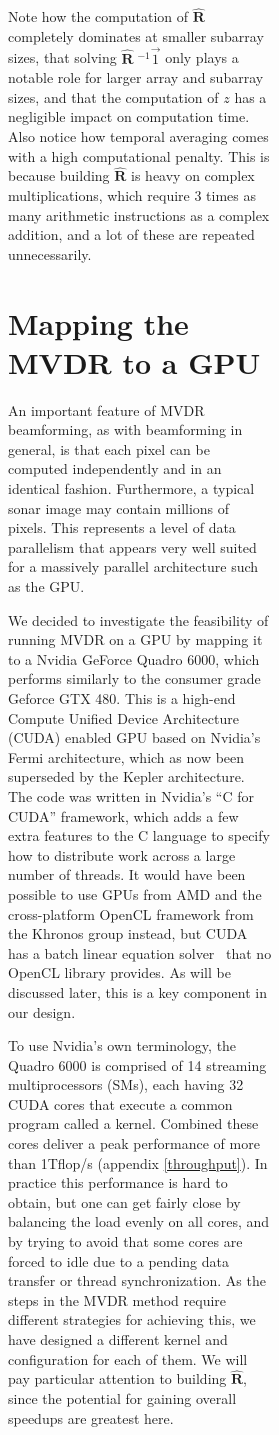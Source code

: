 \documentclass[12pt,journal,draftclsnofoot,onecolumn]{IEEEtran}
\newcommand\mat[1]{\boldsymbol{#1}}
\newcommand\1{\vec 1}
\newcommand*\eR{\mat{\hat R}}
\newcommand*\eRi{\hat{\mat R}\;\!^{-1}}
\begin{document}
\begin{figure}[H]
\begin{figure}[!t]
\begin{figure}[!t]
Note how the computation of $\eR$ completely dominates at smaller subarray sizes, that solving $\eRi\1$ only plays a notable role for larger array and subarray sizes, and that the computation of $z$ has a negligible impact on computation time. Also notice how temporal averaging comes with a high computational penalty. This is because building $\eR$ is heavy on complex multiplications, which require 3 times as many arithmetic instructions as a complex addition, and a lot of these are repeated unnecessarily.




\section{Mapping the MVDR to a GPU}\label{maptogpu}


An important feature of MVDR beamforming, as with beamforming in general, is that each pixel can be computed independently and in an identical fashion. Furthermore, a typical sonar image may contain millions of pixels. This represents a level of data parallelism that appears very well suited for a massively parallel architecture such as the GPU.

We decided to investigate the feasibility of running MVDR on a GPU by mapping it to a Nvidia GeForce Quadro 6000, which performs similarly to the consumer grade Geforce GTX 480. This is a high-end Compute Unified Device Architecture (CUDA) enabled GPU based on Nvidia's Fermi architecture, which as now been superseded by the Kepler architecture. The code was written in Nvidia's ``C for CUDA'' framework, which adds a few extra features to the C language to specify how to distribute work across a large number of threads. It would have been possible to use GPUs from AMD and the cross-platform OpenCL framework from the Khronos group instead, but CUDA has a batch linear equation solver~\cite{Nvidia} that no OpenCL library provides. As will be discussed later, this is a key component in our design.

To use Nvidia's own terminology, the Quadro 6000 is comprised of 14 streaming multiprocessors (SMs), each having 32 CUDA cores that execute a common program called a kernel. Combined these cores deliver a peak performance of more than 1\;Tflop/s (appendix \ref{throughput}). In practice this performance is hard to obtain, but one can get fairly close by balancing the load evenly on all cores, and by trying to avoid that some cores are forced to idle due to a pending data transfer or thread synchronization. As the steps in the MVDR method require different strategies for achieving this, we have designed a different kernel and configuration for each of them. We will pay particular attention to building $\eR$, since the potential for gaining overall speedups are greatest here.


\end{figure}
\end{figure}
\end{figure}
\end{document}

